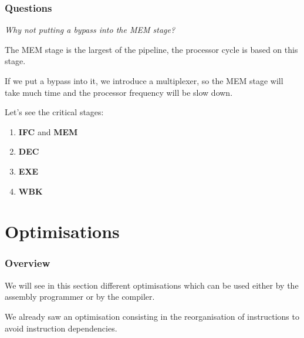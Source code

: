 \begin{frame}
  \frametitle{Questions}

  \textit{Why not putting a bypass into the MEM stage?}

  \-

  The MEM stage is the largest of the pipeline, the processor cycle
  is based on this stage.

  \-

  If we put a bypass into it, we introduce a multiplexer, so the MEM
  stage will take much time and the processor frequency will be slow down.

  \-

  Let's see the critical stages:

  \begin{enumerate}
    \item
      \textbf{IFC} and \textbf{MEM}
    \item
      \textbf{DEC}
    \item
      \textbf{EXE}
    \item
      \textbf{WBK}
  \end{enumerate}
\end{frame}

%
%

\section{Optimisations}


\begin{frame}
  \frametitle{Overview}

  We will see in this section different optimisations which can be
  used either by the assembly programmer or by the compiler.

  \-

  We already saw an optimisation consisting in the reorganisation
  of instructions to avoid instruction dependencies.
\end{frame}


